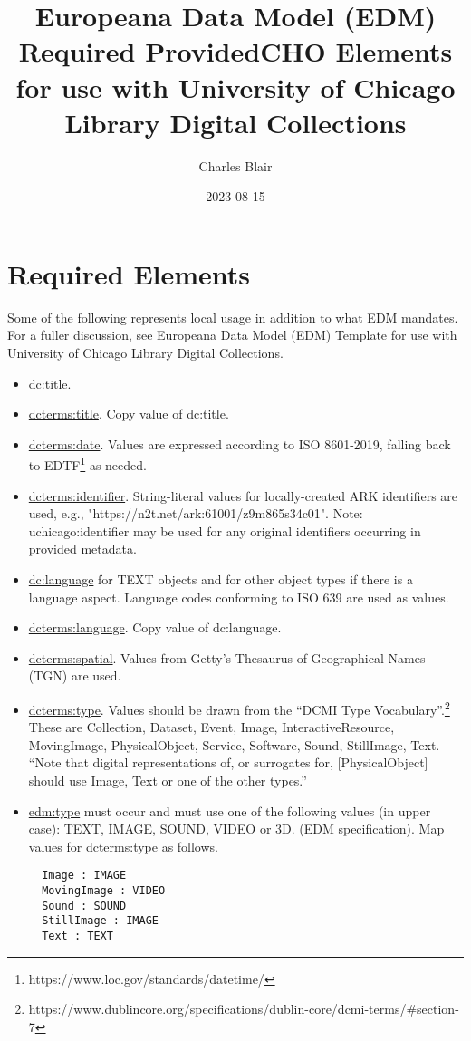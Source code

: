 \documentclass[11pt]{article}
\date{2023-08-15}
\title{Europeana Data Model (EDM) Required ProvidedCHO Elements for use with University of Chicago Library Digital Collections}
\author{Charles Blair}
\begin{document}
\maketitle

\section*{Required Elements}
Some of the following represents local usage in addition to what EDM mandates. For a fuller discussion, see Europeana Data Model (EDM) Template for use with University of Chicago Library Digital Collections.

\begin{itemize}

  \item \underline{dc:title}.

  \item \underline{dcterms:title}. Copy value of dc:title.

  \item \underline{dcterms:date}. Values are expressed according to ISO 8601-2019, falling back to EDTF\footnote{https://www.loc.gov/standards/datetime/} as needed.

  \item \underline{dcterms:identifier}. String-literal values for locally-created ARK identifiers are used, e.g., "https://n2t.net/ark:61001/z9m865s34c01". Note: uchicago:identifier may be used for any original identifiers occurring in provided metadata.

  \item \underline{dc:language} for TEXT objects and for other object types if there is a language aspect. Language codes conforming to ISO 639 are used as values.

  \item \underline{dcterms:language}. Copy value of dc:language.

  \item \underline{dcterms:spatial}. Values from Getty's Thesaurus of Geographical Names (TGN) are used.

  \item \underline{dcterms:type}. Values should be drawn from the ``DCMI Type Vocabulary''.\footnote{https://www.dublincore.org/specifications/dublin-core/dcmi-terms/\#section-7} These are Collection, Dataset, Event, Image, InteractiveResource, MovingImage, PhysicalObject, Service, Software, Sound, StillImage, Text. ``Note that digital representations of, or surrogates for, [PhysicalObject] should use Image, Text or one of the other types.''

  \item \underline{edm:type} must occur and must use one of the following values (in upper case): TEXT, IMAGE, SOUND, VIDEO or 3D. (EDM specification). Map values for dcterms:type as follows.

\begin{verbatim}
  Image : IMAGE
  MovingImage : VIDEO
  Sound : SOUND
  StillImage : IMAGE
  Text : TEXT
\end{verbatim}

\end{itemize}
\end{document}
